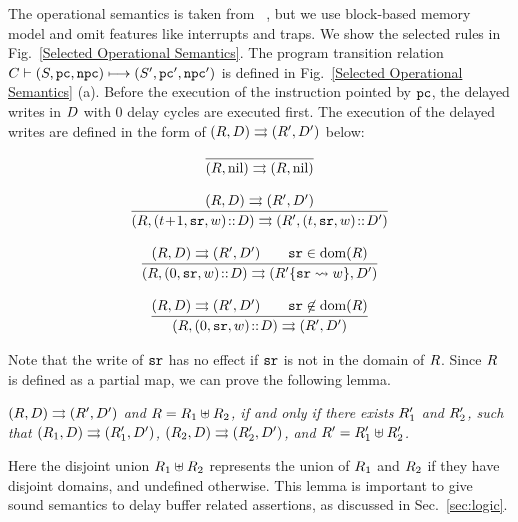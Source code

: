 The operational semantics is taken from 
~\cite{sparc-formalization},
but we use block-based memory model and 
omit features like interrupts and traps.
We show the selected rules in Fig.~\ref{Selected Operational Semantics}.
The program transition relation 
$C \vdash {(S, \texttt{pc}, \texttt{npc})} \longmapsto {(S', \texttt{pc}', \texttt{npc}')}$
is defined 
in Fig.~\ref{Selected Operational Semantics} (a).
Before the execution of the instruction pointed by
$\texttt{pc}$, the delayed writes
in $D$ with $0$ delay cycles are executed first.
The execution of the delayed writes are defined in the
form of ${(R, D)}\rightrightarrows{(R', D')}$ below:

{\small
$$
\begin{array}{c}
\infer
{\Dstep{(\RFile, \nil)}{(\RFile,\nil)}}
{}
\\
\\
%
%
\infer
{\Dstep{(\RFile, (\tick\!+\!1, \sr, \word)\dbCons\DBuf)}
       {(\RFile', (\tick, \sr, \word)\dbCons\DBuf')}}
{\Dstep{(\RFile, \DBuf)}{(\RFile', \DBuf')}}
\\
\\
\infer
{\Dstep{(\RFile, (0, \sr, \word)\dbCons\DBuf)}{(\fsubst{\RFile'}\sr\word, \DBuf')}}
{\Dstep{(\RFile, \DBuf)}{(\RFile', \DBuf')}
\qquad \sr\in\dom(\RFile)
}
%
\\
\\
%
\infer
{\Dstep{(\RFile, (0, \sr, \word)\dbCons\DBuf)}{(\RFile', \DBuf')}}
{\Dstep{(\RFile, \DBuf)}{(\RFile', \DBuf')}
 \qquad \sr\not\in\dom(\RFile)
}
\end{array}
$$
}

Note that the write of $\texttt{sr}$ has no effect if $\texttt{sr}$ is not
in the domain of $R$. Since $R$ is defined as a partial
map, we can prove the following lemma.
\begin{lemma}
    \em
	\label{lemma:RFileSplitExDelay}
	${(R, D)}\rightrightarrows{(R', D')}$
    and $R = R_1 \uplus R_2$,
    if and only if
    there exists $R_1'$ and $R_2'$, such that
    ${(R_1, D)}\rightrightarrows{(R_1', D')}$, ${(R_2, D)}\rightrightarrows{(R_2', D')}$,
    and $R' = R_1' \uplus R_2'$.
\end{lemma}
Here the disjoint union $R_1 \uplus R_2$ represents the union of
$R_1$ and $R_2$ if they have disjoint domains, and undefined
otherwise. This lemma is important to give sound semantics
to delay buffer related assertions, as discussed in
Sec.~\ref{sec:logic}.

